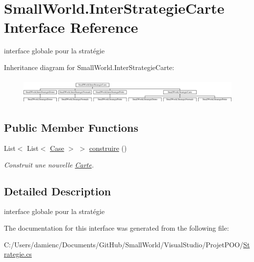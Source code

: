 \hypertarget{interface_small_world_1_1_inter_strategie_carte}{\section{Small\-World.\-Inter\-Strategie\-Carte Interface Reference}
\label{interface_small_world_1_1_inter_strategie_carte}
}


interface globale pour la stratégie  


Inheritance diagram for Small\-World.\-Inter\-Strategie\-Carte\-:\begin{figure}[H]
\begin{center}
\leavevmode
\includegraphics[height=1.339713cm]{interface_small_world_1_1_inter_strategie_carte}
\end{center}
\end{figure}
\subsection*{Public Member Functions}
\begin{DoxyCompactItemize}
\item 
\hypertarget{interface_small_world_1_1_inter_strategie_carte_aef481b6ecc1f7976bd197147709998b0}{List$<$ List$<$ \hyperlink{class_small_world_1_1_case}{Case} $>$ $>$ \hyperlink{interface_small_world_1_1_inter_strategie_carte_aef481b6ecc1f7976bd197147709998b0}{construire} ()}\label{interface_small_world_1_1_inter_strategie_carte_aef481b6ecc1f7976bd197147709998b0}

\begin{DoxyCompactList}\small\item\em Construit une nouvelle \hyperlink{class_small_world_1_1_carte}{Carte}. \end{DoxyCompactList}\end{DoxyCompactItemize}


\subsection{Detailed Description}
interface globale pour la stratégie 

The documentation for this interface was generated from the following file\-:\begin{DoxyCompactItemize}
\item 
C\-:/\-Users/damienc/\-Documents/\-Git\-Hub/\-Small\-World/\-Visual\-Studio/\-Projet\-P\-O\-O/\hyperlink{_strategie_8cs}{Strategie.\-cs}\end{DoxyCompactItemize}
